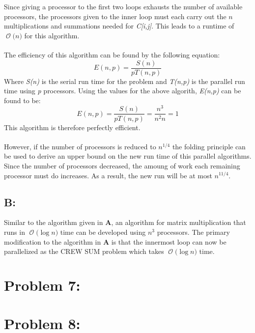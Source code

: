 \documentclass[12pt]{article}
\newcommand{\BigO}[1]{\ensuremath{\operatorname{\mathcal{O}}\bigl(#1\bigr)}}
\begin{document}
Since giving a processor to the first two loops exhausts the number
of available processors, the processors given to the inner loop
must each carry out the $n$ multiplications and summations
needed for \textit{C[i,j]}.  This leads to a runtime of \BigO{n} for 
this algorithm.\\\\
The efficiency of this algorithm can be found by the following equation:
\[
    E(n,p) = \frac{S(n)}{pT(n,p)}
\]
Where \textit{S(n)} is the serial run time for the problem and \textit{T(n,p)}
is the parallel run time using \textit{p} processors.  Using the values for the
above algorith, \textit{E(n,p)} can be found to be:
\[
    E(n,p) = \frac{S(n)}{pT(n,p)} = \frac{n^3}{n^2 n} = 1
\]
This algorithm is therefore perfectly efficient.\\\\
However, if the number of processors is reduced to $n^{1/4}$ the folding
principle can be used to derive an upper bound on the new run time of 
this parallel algorithms.  Since the number of processors decreased,
the amoung of work each remaining processor must do increases.  As
a result, the new run will be at most $n^{11/4}$.
\subsection*{B:}
Similar to the algorithm given in \textbf{A}, an algorithm for 
matrix multiplication that runs in \BigO{\log n} time can be
developed using $n^3$ processors.  The primary modification
to the algorithm in \textbf{A} is that the innermost loop
can now be parallelized as the CREW SUM problem which takes 
\BigO{\log n} time.   
\section*{Problem 7: }
\section*{Problem 8: }
\end{document}
